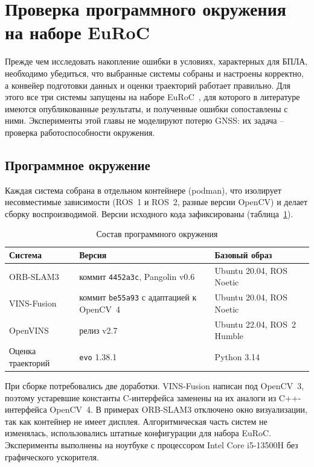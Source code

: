     \section{Проверка программного окружения на наборе EuRoC}\label{sec:euroc}

    Прежде чем исследовать накопление ошибки в условиях, характерных для БПЛА, необходимо убедиться, что выбранные системы собраны и настроены корректно, а конвейер подготовки данных и оценки траекторий работает правильно.
    Для этого все три системы запущены на наборе EuRoC~\cite{euroc}, для которого в литературе имеются опубликованные результаты, и полученные ошибки сопоставлены с ними.
    Эксперименты этой главы не моделируют потерю GNSS: их задача -- проверка работоспособности окружения.

    \subsection{Программное окружение}

    Каждая система собрана в отдельном контейнере (podman), что изолирует несовместимые зависимости (ROS~1 и ROS~2, разные версии OpenCV) и делает сборку воспроизводимой.
    Версии исходного кода зафиксированы (таблица~\ref{table:env}).

    \begin{table}[H]
        \caption{Состав программного окружения}
        \label{table:env}
        \small
        \centering
        \renewcommand{\arraystretch}{1.2}
        \begin{tabularx}{\textwidth}{|l|X|X|}
            \hline
            \textbf{Система} & \textbf{Версия} & \textbf{Базовый образ} \\
            \hline
            ORB-SLAM3 & коммит \texttt{4452a3c}, Pangolin v0.6 & Ubuntu 20.04, ROS Noetic \\
            \hline
            VINS-Fusion & коммит \texttt{be55a93} с адаптацией к OpenCV~4 & Ubuntu 20.04, ROS Noetic \\
            \hline
            OpenVINS & релиз v2.7 & Ubuntu 22.04, ROS~2 Humble \\
            \hline
            Оценка траекторий & \texttt{evo} 1.38.1 & Python 3.14 \\
            \hline
        \end{tabularx}
    \end{table}

    При сборке потребовались две доработки.
    VINS-Fusion написан под OpenCV~3, поэтому устаревшие константы C-интерфейса заменены на их аналоги из C++-интерфейса OpenCV~4.
    В примерах ORB-SLAM3 отключено окно визуализации, так как контейнер не имеет дисплея.
    Алгоритмическая часть систем не изменялась, использовались штатные конфигурации для набора EuRoC.
    Эксперименты выполнены на ноутбуке с процессором Intel Core i5-13500H без графического ускорителя.

